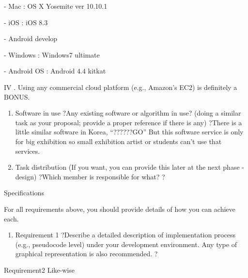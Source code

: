\documentclass{article}
\begin{document}
\noindent   - Mac : OS X Yosemite ver 10.10.1

\noindent   - iOS : iOS 8.3

\noindent 

\noindent - Android develop

\noindent   - Windows : Windows7 ultimate

\noindent   - Android OS : Android 4.4 kitkat

\noindent 

\noindent IV . Using any commercial cloud platform (e.g., Amazon's EC2) is definitely a BONUS. 

\begin{enumerate}
\item  Software in use ?Any existing software or algorithm in use? (doing a similar task as your proposal; provide a proper reference if there is any) ?There is a little similar software in Korea, ``??????GO'' But this software service is only for big exhibition so small exhibition artist or students can't use that services. 

\item  Task distribution (If you want, you can provide this later at the next phase - design) ?Which member is responsible for what? ?
\end{enumerate}

\noindent Specifications 

\noindent For all requirements above, you should provide details of how you can achieve each. 

\begin{enumerate}
\item  Requirement 1 ?Describe a detailed description of implementation process (e.g., pseudocode level) under your development environment. Any type of graphical representation is also recommended. ?
\end{enumerate}

\noindent Requirement2 Like-wise
\end{document}
